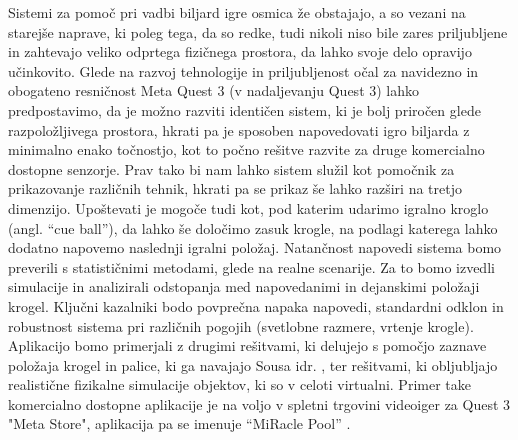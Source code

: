 \documentclass[a4paper, 12pt]{article}
\newcommand\cmnt[1]{\textcolor{munsell}{#1}}
\begin{document}
Sistemi za pomoč pri vadbi biljard igre osmica že obstajajo, a so vezani na starejše naprave, ki poleg tega, da so redke, tudi nikoli niso bile zares priljubljene \cite{Sousa2016} in zahtevajo veliko odprtega fizičnega prostora, da lahko svoje delo opravijo učinkovito. Glede na razvoj tehnologije in priljubljenost očal za navidezno in obogateno resničnost Meta Quest 3 (v nadaljevanju Quest 3) lahko predpostavimo, da je možno razviti identičen sistem, ki je bolj priročen glede razpoložljivega prostora, hkrati pa je sposoben napovedovati igro biljarda z minimalno enako točnostjo, kot to počno rešitve razvite za druge komercialno dostopne senzorje. Prav tako bi nam lahko sistem služil kot pomočnik za prikazovanje različnih tehnik, hkrati pa se prikaz še lahko razširi na tretjo dimenzijo. Upoštevati je mogoče tudi kot, pod katerim udarimo igralno kroglo (angl. ``cue ball''), da lahko še določimo zasuk krogle, na podlagi katerega lahko dodatno napovemo naslednji igralni položaj. 
Natančnost napovedi sistema bomo preverili s statističnimi metodami, glede na realne scenarije. Za to bomo izvedli simulacije in analizirali odstopanja med napovedanimi in dejanskimi položaji krogel. Ključni kazalniki bodo povprečna napaka napovedi, standardni odklon in robustnost sistema pri različnih pogojih (svetlobne razmere, vrtenje krogle). Aplikacijo bomo primerjali z drugimi rešitvami, ki delujejo s pomočjo zaznave položaja krogel in palice, ki ga navajajo Sousa idr. \cite{Sousa2016}, ter rešitvami, ki obljubljajo realistične fizikalne simulacije objektov, ki so v celoti virtualni. Primer take komercialno dostopne aplikacije je na voljo v spletni trgovini videoiger za Quest 3 "Meta Store", aplikacija pa se imenuje ``MiRacle Pool'' \cite{MiraclePool}. \\

\end{document}
